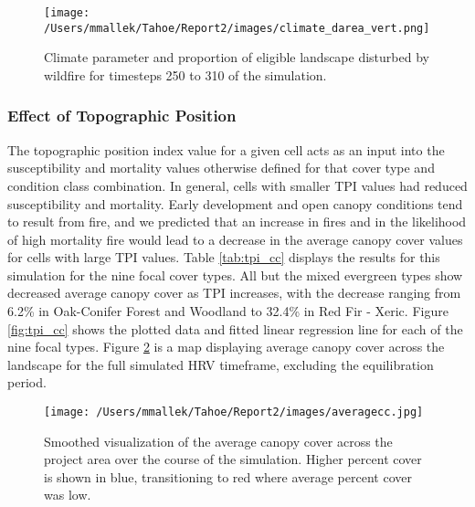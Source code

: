 \begin{figure}[!htbp]
\centering
\texttt{[image: /Users/mmallek/Tahoe/Report2/images/climate\_darea\_vert.png]}
\caption{Climate parameter and proportion of eligible landscape disturbed by wildfire for timesteps 250 to 310 of the simulation.}
\label{fig:compare_clim_darea}
\end{figure}

\clearpage
\subsubsection{Effect of Topographic Position}

The topographic position index value for a given cell acts as an input into the susceptibility and mortality values otherwise defined for that cover type and condition class combination. In general, cells with smaller TPI values had reduced susceptibility and mortality. Early development and open canopy conditions tend to result from fire, and we predicted that an increase in fires and in the likelihood of high mortality fire would lead to a decrease in the average canopy cover values for cells with large TPI values. Table \ref{tab:tpi_cc} displays the results for this simulation for the nine focal cover types. All but the mixed evergreen types show decreased average canopy cover as TPI increases, with the decrease ranging from 6.2\% in Oak-Conifer Forest and Woodland to 32.4\% in Red Fir - Xeric. Figure \ref{fig:tpi_cc} shows the plotted data and fitted linear regression line for each of the nine focal types. Figure \ref{fig:averagecc} is a map displaying average canopy cover across the landscape for the full simulated HRV timeframe, excluding the equilibration period. 

\begin{figure}[!htbp]
\centering
\texttt{[image: /Users/mmallek/Tahoe/Report2/images/averagecc.jpg]}
\caption{Smoothed visualization of the average canopy cover across the project area over the course of the simulation. Higher percent cover is shown in blue, transitioning to red where average percent cover was low.}
\label{fig:averagecc}
\end{figure}

